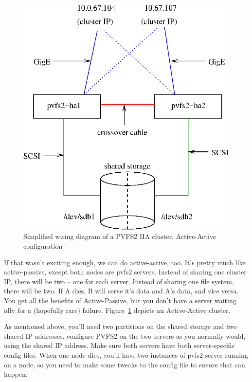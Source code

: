 \documentclass[11pt]{article}
\begin{document}
\begin{figure}
\begin{center}
\includegraphics[scale=0.75]{pvfs2-failover-AA.eps}
\end{center}
\caption{Simplified wiring diagram of a PVFS2 HA cluster, Active-Active
configuration}
\label{fig:nodes-aa}
\end{figure}

If that wasn't exciting enough, we can do active-active, too.  It's
pretty much like active-passive, except both nodes are pvfs2 servers.
Instead of sharing one cluster IP, there will be two -- one for each
server.  Instead of sharing one file system, there will be two.  If A
dies, B will serve it's data and A's data, and vice versa.  You get all
the benefits of Active-Passive, but you don't have a server waiting idly
for a (hopefully rare) failure.   Figure~\ref{fig:nodes-aa} depicts an
Active-Active cluster.

As mentioned above, you'll need two partitions on the shared storage and
two shared IP addresses.  configure PVFS2 on the two servers as you
normally would, using the shared IP address.  Make sure both servers
have both server-specific config files.  When one node dies, you'll have
two instances of pvfs2-server running on a node, so you need to make
some tweaks to the config file to ensure that can happen: 
\end{document}
